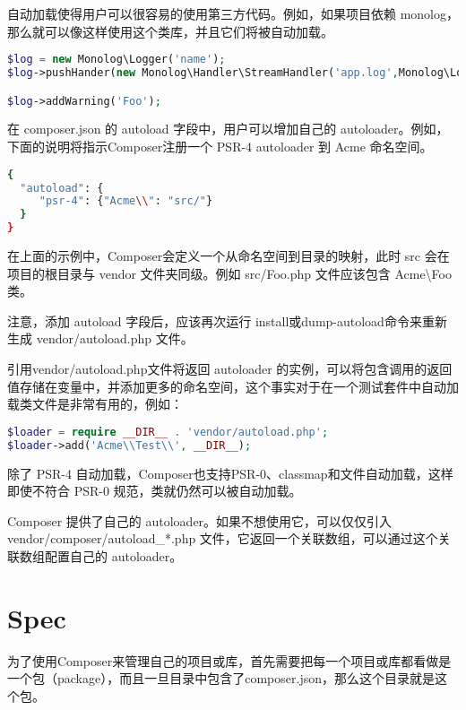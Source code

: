 自动加载使得用户可以很容易的使用第三方代码。例如，如果项目依赖 monolog，那么就可以像这样使用这个类库，并且它们将被自动加载。

\begin{lstlisting}[language=PHP]
$log = new Monolog\Logger('name');
$log->pushHander(new Monolog\Handler\StreamHandler('app.log',Monolog\Logger::WARNING));

$log->addWarning('Foo');
\end{lstlisting}

在 composer.json 的 autoload 字段中，用户可以增加自己的 autoloader。例如，下面的说明将指示Composer注册一个 PSR-4 autoloader 到 Acme 命名空间。

\begin{lstlisting}[language=bash]
{
  "autoload": {
     "psr-4": {"Acme\\": "src/"}
  }
}
\end{lstlisting}


在上面的示例中，Composer会定义一个从命名空间到目录的映射，此时 src 会在项目的根目录与 vendor 文件夹同级。例如 src/Foo.php 文件应该包含 Acme\textbackslash Foo 类。


注意，添加 autoload 字段后，应该再次运行 install或dump-autoload命令来重新生成 vendor/autoload.php 文件。

引用vendor/autoload.php文件将返回 autoloader 的实例，可以将包含调用的返回值存储在变量中，并添加更多的命名空间，这个事实对于在一个测试套件中自动加载类文件是非常有用的，例如：

\begin{lstlisting}[language=PHP]
$loader = require __DIR__ . 'vendor/autoload.php';
$loader->add('Acme\\Test\\', __DIR__);
\end{lstlisting}


除了 PSR-4 自动加载，Composer也支持PSR-0、classmap和文件自动加载，这样即使不符合 PSR-0 规范，类就仍然可以被自动加载。

Composer 提供了自己的 autoloader。如果不想使用它，可以仅仅引入 vendor/composer/autoload\_*.php 文件，它返回一个关联数组，可以通过这个关联数组配置自己的 autoloader。

\section{Spec}

为了使用Composer来管理自己的项目或库，首先需要把每一个项目或库都看做是一个包（package），而且一旦目录中包含了composer.json，那么这个目录就是这个包。

